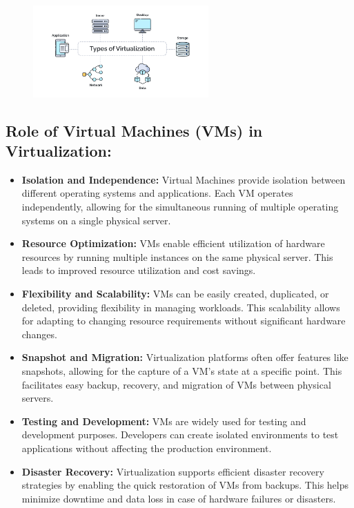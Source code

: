 \documentclass{report}
\begin{document}
\begin{figure}[h] 
    \centering 
    \includegraphics[width=0.6\textwidth]{3.png}
\end{figure} 

\subsection*{Role of Virtual Machines (VMs) in Virtualization:}

\begin{itemize}
  \item \textbf{Isolation and Independence:}
    Virtual Machines provide isolation between different operating systems and applications. Each VM operates independently, allowing for the simultaneous running of multiple operating systems on a single physical server.

  \item \textbf{Resource Optimization:}
    VMs enable efficient utilization of hardware resources by running multiple instances on the same physical server. This leads to improved resource utilization and cost savings.

  \item \textbf{Flexibility and Scalability:}
    VMs can be easily created, duplicated, or deleted, providing flexibility in managing workloads. This scalability allows for adapting to changing resource requirements without significant hardware changes.

  \item \textbf{Snapshot and Migration:}
    Virtualization platforms often offer features like snapshots, allowing for the capture of a VM's state at a specific point. This facilitates easy backup, recovery, and migration of VMs between physical servers.

  \item \textbf{Testing and Development:}
    VMs are widely used for testing and development purposes. Developers can create isolated environments to test applications without affecting the production environment.

  \item \textbf{Disaster Recovery:}
    Virtualization supports efficient disaster recovery strategies by enabling the quick restoration of VMs from backups. This helps minimize downtime and data loss in case of hardware failures or disasters.\cite{3}
\end{itemize}
\end{document}
